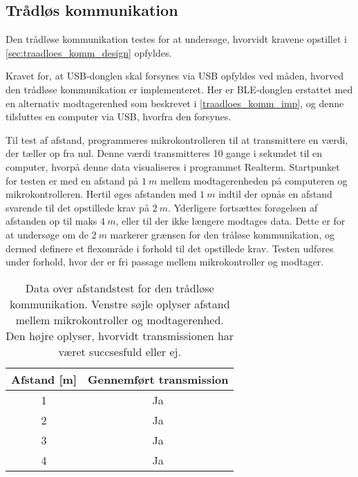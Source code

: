 \subsection{Trådløs kommunikation}
Den trådløse kommunikation testes for at undersøge, hvorvidt kravene opstillet i \autoref{sec:traadloes_komm_design} opfyldes. 

\noindent
Kravet for, at USB-donglen skal forsynes via USB opfyldes ved måden, hvorved den trådløse kommunikation er implementeret. Her er BLE-donglen erstattet med en alternativ modtagerenhed som beskrevet i \autoref{traadloes_komm_imp}, og denne tilsluttes en computer via USB, hvorfra den forsynes. 


\noindent
Til test af afstand, programmeres mikrokontrolleren til at transmittere en værdi, der tæller op fra nul. Denne værdi transmitteres 10 gange i sekundet til en computer, hvorpå denne data visualiseres i programmet Realterm.
Startpunket for testen er med en afstand på $1~m$ mellem modtagerenheden på computeren og mikrokontrolleren. 
Hertil øges afstanden med $1~m$ indtil der opnås en afstand svarende til det opstillede krav på $2~m$. Yderligere fortsættes forøgelsen af afstanden op til maks $4~m$, eller til der ikke længere modtages data. Dette er for at undersøge om de $2~m$ markerer grænsen for den tråløse kommunikation, og dermed definere et flexområde i forhold til det opstillede krav. Testen udføres under forhold, hvor der er fri passage mellem mikrokontroller og modtager.  

\begin{table}[H]
\centering
\begin{tabular}{|c|c|}
\hline 
Afstand [m] & Gennemført transmission \\ 
\hline 
1 & Ja \\ 
\hline 
2 & Ja \\ 
\hline 
3 & Ja \\ 
\hline 
4 & Ja \\ 
\hline 
\end{tabular} 
\caption{Data over afstandstest for den trådløse kommunikation. Venstre søjle oplyser afstand mellem mikrokontroller og modtagerenhed. Den højre oplyser, hvorvidt transmissionen har været succsesfuld eller ej.}
\label{tab:traadloes_komm_test_afstand}
\end{table}

